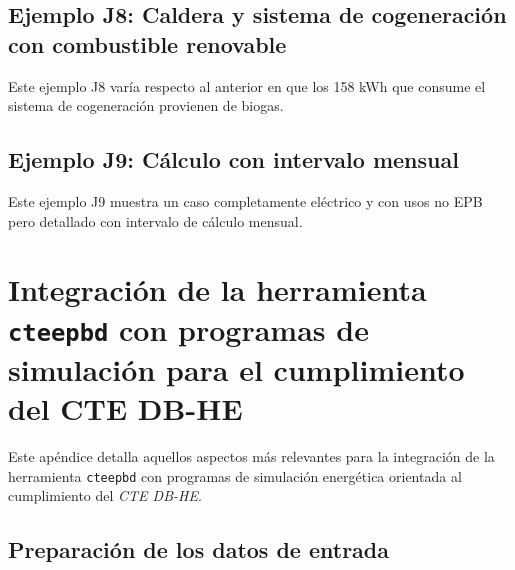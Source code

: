 \documentclass[10pt,notitlepage,oneside,a4paper]{article}
\begin{document}


\subsection{Ejemplo J8: Caldera y sistema de cogeneración con combustible renovable}
Este ejemplo J8 varía respecto al anterior en que los 158 kWh que consume el sistema de cogeneración provienen de biogas.





\subsection{Ejemplo J9: Cálculo con intervalo mensual}
Este ejemplo J9 muestra un caso completamente eléctrico y con usos no EPB pero detallado con intervalo de cálculo mensual.





\clearpage
\newpage
\section{Integración de la herramienta \texttt{cteepbd} con programas de simulación para el cumplimiento del CTE DB-HE}
\label{sec:anexointegracion}
\setcounter{figure}{0} %
\setcounter{table}{0} %

Este apéndice detalla aquellos aspectos más relevantes para la integración de la herramienta \texttt{cteepbd} con programas de simulación energética orientada al cumplimiento del \textit{CTE DB-HE}.

\subsection{Preparación de los datos de entrada}
\end{document}
